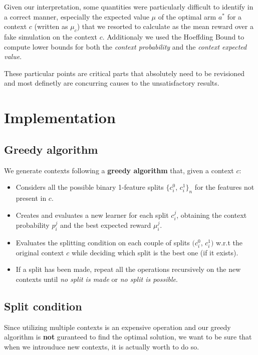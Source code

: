 Given our interpretation, some quantities were particularly difficult to identify in a correct manner, especially the expected value $\mu$ of the optimal arm $a^*$ for a context $c$ (written as $\mu_c$) that we resorted to calculate as the mean reward over a fake simulation on the context $c$.
Additionaly we used the Hoeffding Bound to compute lower bounds for both the \textit{context probability} and the \textit{context expected value}.

These particular points are critical parts that absolutely need to be revisioned and most definetly are concurring causes to the unsatisfactory results.

\section{Implementation}
\label{sec:ctx_gen_imp}

\subsection{Greedy algorithm}

We generate contexts following a \textbf{greedy algorithm} that, given a context $c$:

\begin{itemize}
	\item Considers all the possible binary 1-feature splits $\{c_i^0$, $c_i^1\}_n$ for the features not present in $c$.
	\item Creates and evaluates a new learner for each split $c_i^j$, obtaining the context probability $p_i^j$ and the best expected reward $\mu_i^j$.
	\item Evaluates the splitting condition on each couple of splits $(c_i^0$, $c_i^1)$ w.r.t the original context $c$ while deciding which split is the best one (if it exists).
	\item If a split has been made, repeat all the operations recursively on the new contexts until \textit{no split is made} or \textit{no split is possible}.
\end{itemize}

\subsection{Split condition}

Since utilizing multiple contexts is an expensive operation and our greedy algorithm is \textbf{not} guranteed to find the optimal solution, we want to be sure that when we introuduce new contexts, it is actually worth to do so.


